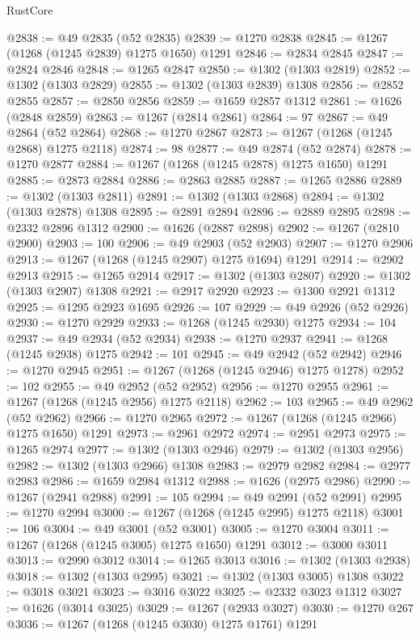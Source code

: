 \begin{lexlean}{RustCore}
\begin{coremodule}
@2838 := @49 @2835 (@52 @2835)
@2839 := @1270 @2838
@2845 := @1267 (@1268 (@1245 @2839) @1275 @1650) @1291
@2846 := @2834 @2845
@2847 := @2824 @2846
@2848 := @1265 @2847
@2850 := @1302 (@1303 @2819)
@2852 := @1302 (@1303 @2829)
@2855 := @1302 (@1303 @2839) @1308
@2856 := @2852 @2855
@2857 := @2850 @2856
@2859 := @1659 @2857 @1312
@2861 := @1626 (@2848 @2859)
@2863 := @1267 (@2814 @2861)
@2864 := 97
@2867 := @49 @2864 (@52 @2864)
@2868 := @1270 @2867
@2873 := @1267 (@1268 (@1245 @2868) @1275 @2118)
@2874 := 98
@2877 := @49 @2874 (@52 @2874)
@2878 := @1270 @2877
@2884 := @1267 (@1268 (@1245 @2878) @1275 @1650) @1291
@2885 := @2873 @2884
@2886 := @2863 @2885
@2887 := @1265 @2886
@2889 := @1302 (@1303 @2811)
@2891 := @1302 (@1303 @2868)
@2894 := @1302 (@1303 @2878) @1308
@2895 := @2891 @2894
@2896 := @2889 @2895
@2898 := @2332 @2896 @1312
@2900 := @1626 (@2887 @2898)
@2902 := @1267 (@2810 @2900)
@2903 := 100
@2906 := @49 @2903 (@52 @2903)
@2907 := @1270 @2906
@2913 := @1267 (@1268 (@1245 @2907) @1275 @1694) @1291
@2914 := @2902 @2913
@2915 := @1265 @2914
@2917 := @1302 (@1303 @2807)
@2920 := @1302 (@1303 @2907) @1308
@2921 := @2917 @2920
@2923 := @1300 @2921 @1312
@2925 := @1295 @2923 @1695
@2926 := 107
@2929 := @49 @2926 (@52 @2926)
@2930 := @1270 @2929
@2933 := @1268 (@1245 @2930) @1275
@2934 := 104
@2937 := @49 @2934 (@52 @2934)
@2938 := @1270 @2937
@2941 := @1268 (@1245 @2938) @1275
@2942 := 101
@2945 := @49 @2942 (@52 @2942)
@2946 := @1270 @2945
@2951 := @1267 (@1268 (@1245 @2946) @1275 @1278)
@2952 := 102
@2955 := @49 @2952 (@52 @2952)
@2956 := @1270 @2955
@2961 := @1267 (@1268 (@1245 @2956) @1275 @2118)
@2962 := 103
@2965 := @49 @2962 (@52 @2962)
@2966 := @1270 @2965
@2972 := @1267 (@1268 (@1245 @2966) @1275 @1650) @1291
@2973 := @2961 @2972
@2974 := @2951 @2973
@2975 := @1265 @2974
@2977 := @1302 (@1303 @2946)
@2979 := @1302 (@1303 @2956)
@2982 := @1302 (@1303 @2966) @1308
@2983 := @2979 @2982
@2984 := @2977 @2983
@2986 := @1659 @2984 @1312
@2988 := @1626 (@2975 @2986)
@2990 := @1267 (@2941 @2988)
@2991 := 105
@2994 := @49 @2991 (@52 @2991)
@2995 := @1270 @2994
@3000 := @1267 (@1268 (@1245 @2995) @1275 @2118)
@3001 := 106
@3004 := @49 @3001 (@52 @3001)
@3005 := @1270 @3004
@3011 := @1267 (@1268 (@1245 @3005) @1275 @1650) @1291
@3012 := @3000 @3011
@3013 := @2990 @3012
@3014 := @1265 @3013
@3016 := @1302 (@1303 @2938)
@3018 := @1302 (@1303 @2995)
@3021 := @1302 (@1303 @3005) @1308
@3022 := @3018 @3021
@3023 := @3016 @3022
@3025 := @2332 @3023 @1312
@3027 := @1626 (@3014 @3025)
@3029 := @1267 (@2933 @3027)
@3030 := @1270 @267
@3036 := @1267 (@1268 (@1245 @3030) @1275 @1761) @1291

\end{coremodule}
\end{lexlean}
